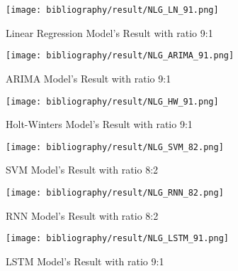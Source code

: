 \documentclass{ieeeojies}
\begin{document}
	\begin{figure}[H]
		\centering
		\begin{minipage}{0.9\linewidth}
			\centering
			\texttt{[image: bibliography/result/NLG\_LN\_91.png]}
			\caption{Linear Regression Model's Result with ratio 9:1}
			\label{fig3.1}
		\end{minipage}
	\end{figure}
	\begin{figure}[H]
		\centering
		\begin{minipage}{0.9\linewidth}
			\centering
			\texttt{[image: bibliography/result/NLG\_ARIMA\_91.png]}
			\caption{ARIMA Model's Result with ratio 9:1}
			\label{fig3.2}
		\end{minipage}
	\end{figure}
	\begin{figure}[H]
		\centering
		\begin{minipage}{0.9\linewidth}
			\centering
			\texttt{[image: bibliography/result/NLG\_HW\_91.png]}
			\caption{Holt-Winters Model's Result with ratio 9:1}
			\label{fig3.3}
		\end{minipage}
	\end{figure}
	\begin{figure}[H]
		\centering
		\begin{minipage}{0.9\linewidth}
			\centering
			\texttt{[image: bibliography/result/NLG\_SVM\_82.png]}
			\caption{SVM Model's Result with ratio 8:2}
			\label{fig3.4}
		\end{minipage}
	\end{figure}
	\begin{figure}[H]
		\centering
		\begin{minipage}{0.9\linewidth}
			\centering
			\texttt{[image: bibliography/result/NLG\_RNN\_82.png]}
			\caption{RNN Model's Result with ratio 8:2}
			\label{fig3.5}
		\end{minipage}
	\end{figure}

	\vspace{\baselineskip}
	\begin{figure}[H]
		\centering
		\begin{minipage}{0.9\linewidth}
			\centering
			\texttt{[image: bibliography/result/NLG\_LSTM\_91.png]}
			\caption{LSTM Model's Result with ratio 9:1}
			\label{fig3.6}
		\end{minipage}
	\end{figure}
\end{document}

